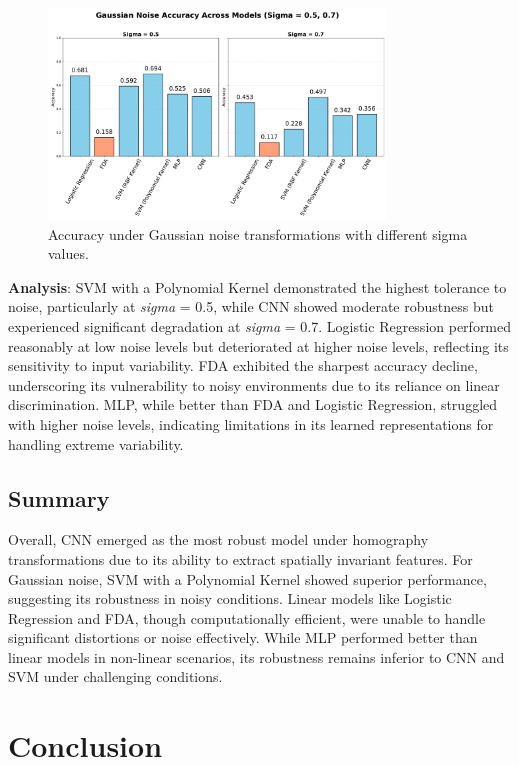 \documentclass{article}
\begin{document}
\begin{figure}[h!]
    \centering
    \includegraphics[width=0.8\textwidth]{images/gaussian_noise.pdf}
    \caption{Accuracy under Gaussian noise transformations with different sigma values.}
    \label{fig:gaussian_noise_accuracy}
\end{figure}

\textbf{Analysis}:  
SVM with a Polynomial Kernel demonstrated the highest tolerance to noise, particularly at \textit{sigma} = 0.5, while CNN showed moderate robustness but experienced significant degradation at \textit{sigma} = 0.7. Logistic Regression performed reasonably at low noise levels but deteriorated at higher noise levels, reflecting its sensitivity to input variability. FDA exhibited the sharpest accuracy decline, underscoring its vulnerability to noisy environments due to its reliance on linear discrimination. MLP, while better than FDA and Logistic Regression, struggled with higher noise levels, indicating limitations in its learned representations for handling extreme variability.

\subsection{Summary}
Overall, CNN emerged as the most robust model under homography transformations due to its ability to extract spatially invariant features. For Gaussian noise, SVM with a Polynomial Kernel showed superior performance, suggesting its robustness in noisy conditions. Linear models like Logistic Regression and FDA, though computationally efficient, were unable to handle significant distortions or noise effectively. While MLP performed better than linear models in non-linear scenarios, its robustness remains inferior to CNN and SVM under challenging conditions.


\section{Conclusion}
\end{document}
